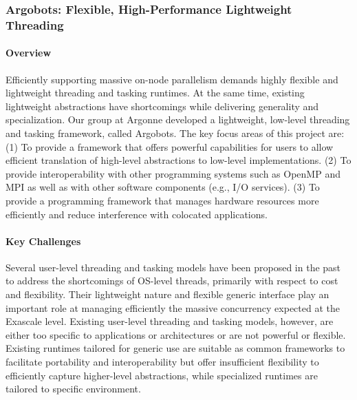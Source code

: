 \newpage

\subsubsection{ Argobots: Flexible, High-Performance Lightweight Threading }

\paragraph{Overview}

Efficiently supporting massive on-node parallelism demands highly
flexible and lightweight threading and tasking runtimes. At the
same time, existing lightweight abstractions have shortcomings while
delivering generality and specialization.  Our group at Argonne
developed a lightweight, low-level threading and tasking framework,
called Argobots.  The key focus areas of this project are: (1) To
provide a framework that offers powerful capabilities for users to
allow efficient translation of high-level abstractions to low-level
implementations. (2) To provide interoperability with other
programming systems such as OpenMP and MPI as well as with other
software components (e.g., I/O services). (3) To provide a programming
framework that manages hardware resources more efficiently and reduce
interference with colocated applications.

\paragraph{Key Challenges}

Several user-level threading and tasking models have been proposed in
the past to address the shortcomings of OS-level threads, primarily
with respect to cost and flexibility. Their lightweight nature and
flexible generic interface play an important role at managing
efficiently the massive concurrency expected at the Exascale level.
Existing user-level threading and tasking models, however, are either
too specific to applications or architectures or are not powerful or
flexible. Existing runtimes tailored for generic use \cite{GNUPth,
PLDI97_Taura, COSET05_Thibault, COB14_Nakashima, MTAAP08_Wheeler,
PPoPP99_Taura, SenSys06_Dunkels, TBB1, EuroPar08_Perache} are suitable
as common frameworks to facilitate portability and interoperability
but offer insufficient flexibility to efficiently capture higher-level
abstractions, while specialized runtimes \cite{ATC02_Adya,
SolarisThreads, SOSP03_von_Behren, StateThreads, PLDI07_Li,
MTAAP09_Porterfield, WMPP05_Cuvillo, IntelOMP, Nanos++, LCPC96_Kale,
PACT14_Treichler} are tailored to specific environment.

